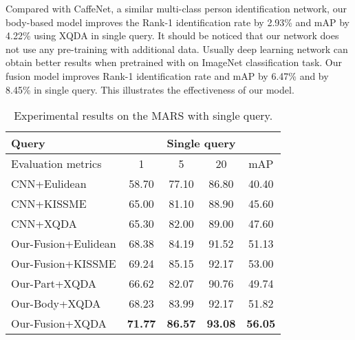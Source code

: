 \documentclass[10pt,twocolumn,letterpaper]{article}
\begin{document}
Compared with CaffeNet, a similar multi-class person identification network, our body-based model
improves the Rank-1 identification rate by 2.93\% and mAP by 4.22\% using XQDA in single query.
It should be noticed that our network does not use any pre-training with additional data.
Usually deep learning network can obtain better results when pretrained with on ImageNet classification task.
Our fusion model improves Rank-1 identification rate and mAP by 6.47\% and by 8.45\% in single query.
This illustrates the effectiveness of our model.
\begin{table}[!tbp]
  \begin{center}
  \scriptsize
    \begin{tabular}{|l|cccc|}
    \hline
    Query & \multicolumn{4}{c|}{Single query} \\
    \hline
    Evaluation metrics & 1     & 5     & 20    & mAP \\
    \hline
    \hline
    CNN+Eulidean~\cite{ZhengliangECCV16} & 58.70  & 77.10  & 86.80  & 40.40  \\
    CNN+KISSME~\cite{ZhengliangECCV16} & 65.00  & 81.10  & 88.90  & 45.60  \\
    CNN+XQDA~\cite{ZhengliangECCV16} & 65.30  & 82.00  & 89.00  & 47.60  \\
    \hline
    \hline
    Our-Fusion+Eulidean & 68.38  & 84.19  & 91.52  & 51.13  \\
    Our-Fusion+KISSME & 69.24  & 85.15  & 92.17  & 53.00  \\
    \hline
    \hline
    Our-Part+XQDA & 66.62  & 82.07  & 90.76  & 49.74  \\
    Our-Body+XQDA & 68.23  & 83.99  & 92.17  & 51.82  \\
Our-Fusion+XQDA & \textbf{71.77}  & \textbf{86.57}  & \textbf{93.08}  & \textbf{56.05}    \\
    \hline
    \end{tabular}\end{center}
  \caption{Experimental results on the MARS with single query.}
  \vspace{-1em}
  \label{tab:marsresults_single}\end{table}
\end{document}
